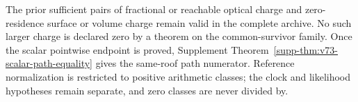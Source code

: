 \documentclass[11pt,reqno]{amsart}
\numberwithin{equation}{section}
\theoremstyle{definition}
\theoremstyle{remark}\newtheorem{remark}[theorem]{Remark}
\begin{document}
The prior sufficient pairs of fractional or reachable optical charge
and zero-residence surface or volume charge remain valid in the complete
archive. No such larger charge is declared zero by a theorem on the
common-survivor family. Once the scalar pointwise endpoint is proved,
Supplement Theorem~\ref{supp-thm:v73-scalar-path-equality} gives the
same-roof path numerator. Reference normalization is restricted to
positive arithmetic classes; the clock and likelihood hypotheses remain
separate, and zero classes are never divided by.

\appendix

\begingroup
\small
\enlargethispage{2\baselineskip}

\endgroup
\end{document}
